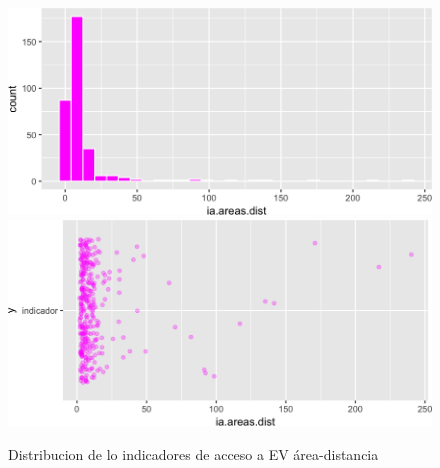 \documentclass[12pt,]{book}
\begin{document}
\begin{figure}
\includegraphics[width=1\linewidth]{tesis-unigis_files/figure-latex/hist-areasdist-1} \includegraphics[width=1\linewidth]{tesis-unigis_files/figure-latex/hist-areasdist-2} \caption{Distribucion de lo indicadores de acceso a EV área-distancia }\label{fig:hist-areasdist}
\end{figure}
\end{document}
